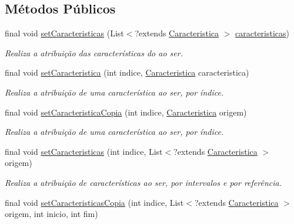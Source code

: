 \subsection*{Métodos Públicos}
\begin{DoxyCompactItemize}
\item 
final void \hyperlink{classic_1_1populacional_1_1_ser_3_01_g_01extends_01_number_01_4_ab6e5a52bc30b0a02e40bc0a5f98eacd5}{set\-Caracteristicas} (List$<$?extends \hyperlink{interfaceic_1_1populacional_1_1_caracteristica}{Caracteristica} $>$ \hyperlink{classic_1_1populacional_1_1_ser_3_01_g_01extends_01_number_01_4_a1d2fa894c1d58b8fc3a1aaba3548b873}{caracteristicas})
\begin{DoxyCompactList}\small\item\em Realiza a atribuição das características do ao ser. \end{DoxyCompactList}\item 
final void \hyperlink{classic_1_1populacional_1_1_ser_3_01_g_01extends_01_number_01_4_a698c20c11581878ce8ac47271070045a}{set\-Caracteristica} (int indice, \hyperlink{interfaceic_1_1populacional_1_1_caracteristica}{Caracteristica} caracteristica)
\begin{DoxyCompactList}\small\item\em Realiza a atribuição de uma característica ao ser, por índice. \end{DoxyCompactList}\item 
final void \hyperlink{classic_1_1populacional_1_1_ser_3_01_g_01extends_01_number_01_4_ad35bbfcebc90a60cfa1f3adab3c07a11}{set\-Caracteristica\-Copia} (int indice, \hyperlink{interfaceic_1_1populacional_1_1_caracteristica}{Caracteristica} origem)
\begin{DoxyCompactList}\small\item\em Realiza a atribuição de uma característica ao ser, por índice. \end{DoxyCompactList}\item 
final void \hyperlink{classic_1_1populacional_1_1_ser_3_01_g_01extends_01_number_01_4_a397038234b7738818d8468d342826ec4}{set\-Caracteristicas} (int indice, List$<$?extends \hyperlink{interfaceic_1_1populacional_1_1_caracteristica}{Caracteristica} $>$ origem)
\begin{DoxyCompactList}\small\item\em Realiza a atribuição de características ao ser, por intervalos e por referência. \end{DoxyCompactList}\item 
final void \hyperlink{classic_1_1populacional_1_1_ser_3_01_g_01extends_01_number_01_4_a99ef67a009e442488a5fbc3acd3c1c10}{set\-Caracteristicas\-Copia} (int indice, List$<$?extends \hyperlink{interfaceic_1_1populacional_1_1_caracteristica}{Caracteristica} $>$ origem, int inicio, int fim)

\end{DoxyCompactItemize}

